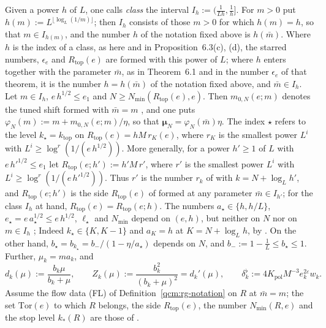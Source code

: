 \documentclass[11pt,letterpaper,reqno]{amsart}
\theoremstyle{definition}
\begin{document}
Given a power $h$ of $L$, one calls \emph{class} the interval $I_h:=(\frac1{Lh},\frac1h]$.
For $m>0$ put $h(m):=L^{\lfloor\log_L(1/m)\rfloor}$;
then $I_h$ consists of those $m>0$ for which $h(m)=h$, so that $m\in I_{h(m)}$, and the number $h$ of the notation fixed above is $h(\bar m)$.
Where $h$ is the index of a class, as here and in Proposition~6.3(c), (d), the starred numbers, $\epsilon_e$ and $R_{\mathrm{top}}(e)$ are formed with this power of $L$;
where $h$ enters together with the parameter $\bar m$, as in Theorem~6.1 and in the number $\epsilon_e$ of that theorem, it is the number $h=h(\bar m)$ of the notation fixed above, and $\bar m\in I_h$.
Let $m\in I_h$, $e\,h^{1/2}\le e_1$ and $N\ge N_{\min}(R_{\mathrm{top}}(e),e)$.
Then $m_{0,N}(e;m)$ denotes the tuned shift formed with $\bar m=m$ \cite[Section~16.4, Theorems~16.3--16.4]{QEDConstruction}, and one puts $\varphi_N(m):=m+m_{0,N}(e;m)/\eta$, so that $\boldsymbol\mu_N=\varphi_N(\bar m)\eta$.
The index $\star$ refers to the level $k_\star=k_{\mathrm{top}}$ on $R_{\mathrm{top}}(e)=hM\,r_K(e)$, where $r_K$ is the smallest power $L^i$ with $L^i\ge\log^r(1/(e\,h^{1/2}))$.
More generally, for a power $h'\ge1$ of $L$ with $e\,h'^{1/2}\le e_1$ let $R_{\mathrm{top}}(e;h'):=h'M\,r'$, where $r'$ is the smallest power $L^i$ with $L^i\ge\log^r(1/(e\,h'^{1/2}))$.
Thus $r'$ is the number $r_k$ of \cite[Proposition~16.1 and Sections~15--16]{QEDConstruction} with $k=N+\log_Lh'$, and $R_{\mathrm{top}}(e;h')$ is the side $R_{\mathrm{top}}(e)$ of \cite[Proposition~16.1 and Sections~15--16]{QEDConstruction} formed at any parameter $\bar m\in I_{h'}$;
for the class $I_h$ at hand, $R_{\mathrm{top}}(e)=R_{\mathrm{top}}(e;h)$.
The numbers $a_\star\in\{h,h/L\}$, $e_\star=e\,a_\star^{1/2}\le e\,h^{1/2}$, $\ell_\star$ and $N_{\min}$ depend on $(e,h)$, but neither on $N$ nor on $m\in I_h$ \cite[Proposition~16.1 and Section~16.1]{QEDConstruction};
Indeed $k_\star\in\{K,K-1\}$ and $a_K=h$ at $K=N+\log_Lh$, by \cite[Proposition~16.1]{QEDConstruction}.
On the other hand, $b_\star=b_{k_\star}=b_-/(1-\eta/a_\star)$ depends on $N$, and $b_-:=1-\frac1L\le b_\star\le1$.
Further, $\mu_k=ma_k$, and
\begin{equation*}
d_k(\mu):=\frac{b_k\mu}{b_k+\mu},\qquad Z_k(\mu):=\frac{b_k^2}{(b_k+\mu)^2}=d_k'(\mu),\qquad\delta^\flat_k:=4K_{\mathrm{pol}}M^{-3}e_k^{2\varepsilon}w_k.
\end{equation*}
Assume the flow data (FL) of Definition~\ref{qcm:rg-notation} on $R$ at $\bar m=m$;
the set $\mathrm{Tor}(e)$ to which $R$ belongs, the side $R_{\mathrm{top}}(e)$, the number $N_{\min}(R,e)$ and the stop level $k_*(R)$ are those of \cite[Proposition~16.1 and Sections~15--16]{QEDConstruction}.
\end{document}
